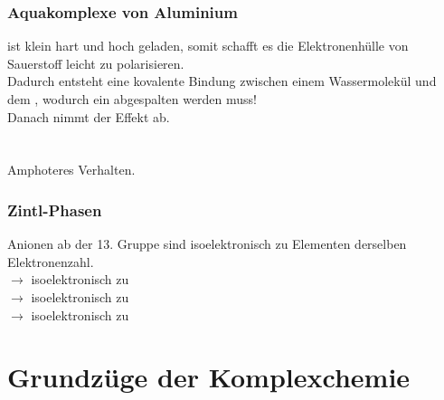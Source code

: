 \documentclass{article}
\begin{document}
\subsubsection{Aquakomplexe von Aluminium}
 ist klein hart und hoch geladen, somit schafft es die Elektronenhülle von Sauerstoff leicht zu polarisieren.\\
Dadurch entsteht eine kovalente Bindung zwischen einem Wassermolekül und dem , wodurch ein  abgespalten werden muss!\\
Danach nimmt der Effekt ab.\\
\\
\\
Amphoteres Verhalten.

\subsubsection{Zintl-Phasen}
Anionen ab der 13. Gruppe sind isoelektronisch zu Elementen derselben Elektronenzahl.\\
 $\rightarrow$  isoelektronisch zu \\
 $\rightarrow$  isoelektronisch zu \\
 $\rightarrow$  isoelektronisch zu \\

\section{Grundzüge der Komplexchemie}
\end{document}
